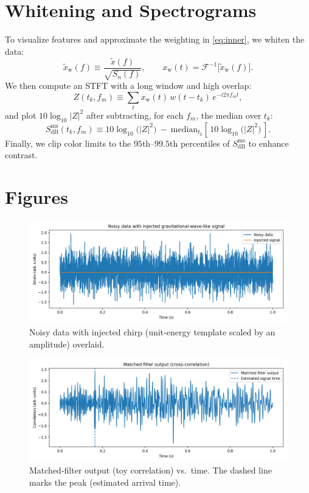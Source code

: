 \documentclass[11pt,a4paper]{article}
\begin{document}
\section{Whitening and Spectrograms}
To visualize features and approximate the weighting in \eqref{eq:inner}, we whiten the data:
\begin{equation}
\tilde x_{\mathrm{w}}(f) \equiv \frac{\tilde x(f)}{\sqrt{S_n(f)}}, \qquad
x_{\mathrm{w}}(t) = \mathcal{F}^{-1}\!\big[\tilde x_{\mathrm{w}}(f)\big]. \label{eq:whiten}
\end{equation}
We then compute an STFT with a long window and high overlap:
\begin{equation}
Z(t_k,f_m) \equiv \sum_{t} x_{\mathrm{w}}(t)\,w(t-t_k)\,e^{-i2\pi f_m t}, \label{eq:stft}
\end{equation}
and plot $10\log_{10}|Z|^2$ after subtracting, for each $f_m$, the median over $t_k$:
\begin{equation}
S_{\mathrm{dB}}^{\mathrm{ms}}(t_k,f_m) \equiv 10\log_{10}\!\big(|Z|^2\big)
~ - ~ \mathrm{median}_{t_k}\!\left[\,10\log_{10}\!\big(|Z|^2\big)\,\right]. \label{eq:medsub}
\end{equation}
Finally, we clip color limits to the $95$th--$99.5$th percentiles of $S_{\mathrm{dB}}^{\mathrm{ms}}$ to enhance contrast.

\section{Figures}
\begin{figure}[h!]\centering
\includegraphics[width=0.95\linewidth]{fig1_timeseries.png}
\caption{Noisy data with injected chirp (unit-energy template scaled by an amplitude) overlaid.}
\end{figure}

\begin{figure}[h!]\centering
\includegraphics[width=0.95\linewidth]{fig2_correlation.png}
\caption{Matched-filter output (toy correlation) vs.\ time. The dashed line marks the peak (estimated arrival time).}
\end{figure}
\end{document}
